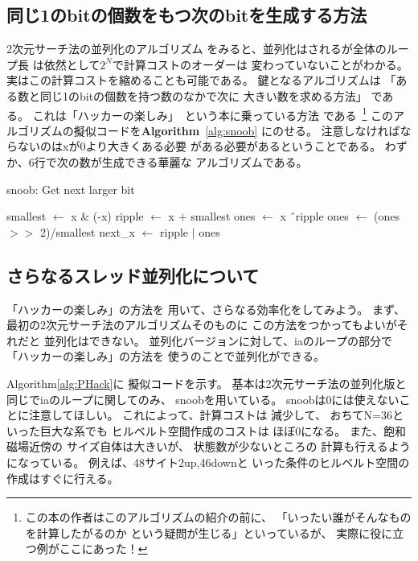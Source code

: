 \documentclass[prb,aps,showpacs,preprint,nofootinbib]{revtex4}
\newcommand{\lef}{\leftarrow}
\begin{document}
\newpage
\subsection{同じ1のbitの個数をもつ次のbitを生成する方法}
\label{sec:snoob}
2次元サーチ法の並列化のアルゴリズム
をみると、並列化はされるが全体のループ長
は依然として$2^{N}$で計算コストのオーダーは
変わっていないことがわかる。
実はこの計算コストを縮めることも可能である。
鍵となるアルゴリズムは
「ある数と同じ1のbitの個数を持つ数のなかで次に
大きい数を求める方法」
である。
これは「ハッカーの楽しみ」~\cite{hacker}という本に乗っている方法
である~\footnote{この本の作者はこのアルゴリズムの紹介の前に、
「いったい誰がそんなものを計算したがるのか
という疑問が生じる」といっているが、
実際に役に立つ例がここにあった！}
このアルゴリズムの擬似コードを{\bf Algorithm}~\ref{alg:snoob}
にのせる。
注意しなければならないのはxが0より大きくある必要
がある必要があるということである。
わずか、6行で次の数が生成できる華麗な
アルゴリズムである。

\begin{algorithm}                      
\caption{snoob: Get next larger bit}         
\begin{algorithmic}                  
\STATE smallest $\lef$ x $\&$ (-x)
\STATE ripple $\lef$ x $+$ smallest
\STATE ones $\lef$ x \^\ ripple
\STATE ones $\lef$ (ones $>>$ 2)/smallest
\STATE next\_x $\lef$ ripple $|$ ones
\end{algorithmic}
\label{alg:snoob}                          
\end{algorithm}


\subsection{さらなるスレッド並列化について}
\label{sec:thread}
「ハッカーの楽しみ」の方法を
用いて、さらなる効率化をしてみよう。
まず、最初の2次元サーチ法のアルゴリズムそのものに
この方法をつかってもよいがそれだと
並列化はできない。
並列化バージョンに対して、iaのループの部分で
「ハッカーの楽しみ」の方法を
使うのことで並列化ができる。

Algorithm\ref{alg:PHack}に
擬似コードを示す。
基本は2次元サーチ法の並列化版と
同じでiaのループに関してのみ、
snoobを用いている。
snoobは0には使えないことに注意してほしい。
これによって、計算コストは
減少して、
おちてN=36といった巨大な系でも
ヒルベルト空間作成のコストは
ほぼ0になる。
また、飽和磁場近傍の
サイズ自体は大きいが、
状態数が少ないところの
計算も行えるようになっている。
例えば、48サイト2up,46downと
いった条件のヒルベルト空間の作成はすぐに行える。
\end{document}
